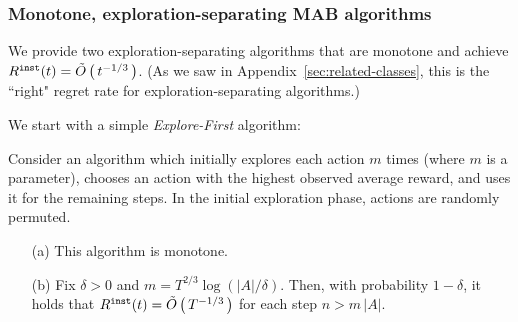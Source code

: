 



\subsubsection{Monotone, exploration-separating MAB algorithms}
\label{app:MAB-monotone-naive}



We provide two exploration-separating algorithms that are monotone and achieve $R^{\mathtt{inst}}(t)=\tilde{O}\left(\,t^{-1/3}\,\right)$. (As we saw in Appendix~\ref{sec:related-classes}, this is the ``right" regret rate for exploration-separating algorithms.)


We start with a simple \emph{Explore-First} algorithm:

\begin{lemma}
Consider an algorithm which initially explores each action $m$ times (where $m$ is a parameter), chooses an action  with the highest observed average reward, and uses it for the remaining steps. In the initial exploration phase, actions are randomly permuted.
\begin{itemize}
\item[(a)] This algorithm is monotone.

\item[(b)] Fix $\delta>0$ and
    $m = T^{2/3}\log(|A|/\delta)$.
Then, with probability $1-\delta$, it holds that
    $R^{\mathtt{inst}}(t)=\tilde{O}\left(\,T^{-1/3}\,\right)$
for each step $n> m\,|A|$.
\end{itemize}
\end{lemma}

